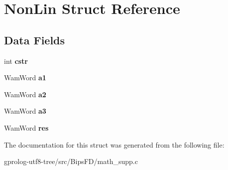 \hypertarget{structNonLin}{}\section{Non\+Lin Struct Reference}
\label{structNonLin}
\subsection*{Data Fields}
\begin{DoxyCompactItemize}
\item 
int {\bfseries cstr}\hypertarget{structNonLin_ace702860218e3fed62bb3235547358aa}{}\label{structNonLin_ace702860218e3fed62bb3235547358aa}

\item 
Wam\+Word {\bfseries a1}\hypertarget{structNonLin_a143b9a64bce8684b7cc00bea2c48639b}{}\label{structNonLin_a143b9a64bce8684b7cc00bea2c48639b}

\item 
Wam\+Word {\bfseries a2}\hypertarget{structNonLin_a94219bccdea182e374720870a013da88}{}\label{structNonLin_a94219bccdea182e374720870a013da88}

\item 
Wam\+Word {\bfseries a3}\hypertarget{structNonLin_a3e4eeac9f54cd48366e50824833a9271}{}\label{structNonLin_a3e4eeac9f54cd48366e50824833a9271}

\item 
Wam\+Word {\bfseries res}\hypertarget{structNonLin_af8f4e398e6c9371309ae73d04456f4f0}{}\label{structNonLin_af8f4e398e6c9371309ae73d04456f4f0}

\end{DoxyCompactItemize}


The documentation for this struct was generated from the following file\+:\begin{DoxyCompactItemize}
\item 
gprolog-\/utf8-\/tree/src/\+Bips\+F\+D/math\+\_\+supp.\+c\end{DoxyCompactItemize}
